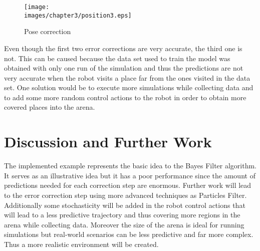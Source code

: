 \begin{figure}[h!]
  \centering
  \texttt{[image: \\images/chapter3/position3.eps]}
  \caption{Pose correction}
  \label{fig:ch-3:pose-correction}
\end{figure}

Even though the first two error corrections are very accurate, the third one is not. This can be caused because the data set used to train the model was obtained with only one run of the simulation and thus the predictions are not very accurate when the robot visits a place far from the ones visited in the data set. One solution would be to execute more simulations while collecting data and to add some more random control actions to the robot in order to obtain more covered places into the arena.

\section{Discussion and Further Work}

The implemented example represents the basic idea to the Bayes Filter algorithm. It serves as an illustrative idea but it has a poor performance since the amount of predictions needed for each correction step are enormous. Further work will lead to the error correction step using more advanced techniques as Particles Filter. Additionally some stochasticity will be added in the robot control actions that will lead to a less predictive trajectory and thus covering more regions in the arena while collecting data. Moreover the size of the arena is ideal for running simulations but real-world scenarios can be less predictive and far more complex. Thus a more realistic environment will be created.










